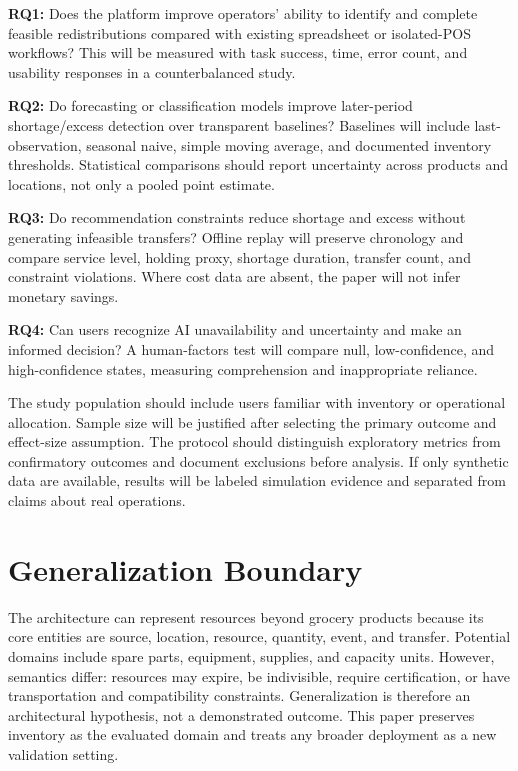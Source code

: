 \documentclass[graybox]{svmult}
\begin{document}
\textbf{RQ1:} Does the platform improve operators' ability to identify and complete feasible redistributions compared with existing spreadsheet or isolated-POS workflows? This will be measured with task success, time, error count, and usability responses in a counterbalanced study.

\textbf{RQ2:} Do forecasting or classification models improve later-period shortage/excess detection over transparent baselines? Baselines will include last-observation, seasonal naive, simple moving average, and documented inventory thresholds. Statistical comparisons should report uncertainty across products and locations, not only a pooled point estimate.

\textbf{RQ3:} Do recommendation constraints reduce shortage and excess without generating infeasible transfers? Offline replay will preserve chronology and compare service level, holding proxy, shortage duration, transfer count, and constraint violations. Where cost data are absent, the paper will not infer monetary savings.

\textbf{RQ4:} Can users recognize AI unavailability and uncertainty and make an informed decision? A human-factors test will compare null, low-confidence, and high-confidence states, measuring comprehension and inappropriate reliance.

The study population should include users familiar with inventory or operational allocation. Sample size will be justified after selecting the primary outcome and effect-size assumption. The protocol should distinguish exploratory metrics from confirmatory outcomes and document exclusions before analysis. If only synthetic data are available, results will be labeled simulation evidence and separated from claims about real operations.

\section{Generalization Boundary}
The architecture can represent resources beyond grocery products because its core entities are source, location, resource, quantity, event, and transfer. Potential domains include spare parts, equipment, supplies, and capacity units. However, semantics differ: resources may expire, be indivisible, require certification, or have transportation and compatibility constraints. Generalization is therefore an architectural hypothesis, not a demonstrated outcome. This paper preserves inventory as the evaluated domain and treats any broader deployment as a new validation setting.
\end{document}
